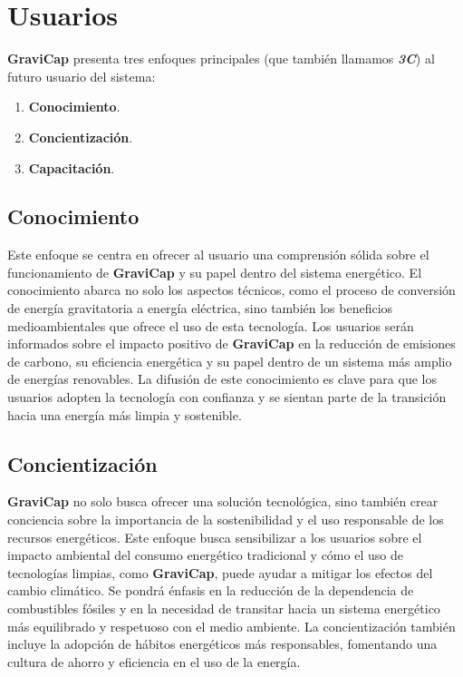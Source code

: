         \section{Usuarios}
            \textcolor{dark_violet}{\textbf{GraviCap}} presenta tres enfoques principales (que también llamamos \textcolor{light_violet}{\textbf{\textit{3C}}}) al futuro usuario del sistema:\par
            \begin{enumerate}
                \setlength{\itemindent}{2.5em}
                
                \item \textbf{Conocimiento}.
                \item \textbf{Concientización}.
                \item \textbf{Capacitación}.
            \end{enumerate}
            \subsection{Conocimiento}
                Este enfoque se centra en ofrecer al usuario una comprensión sólida sobre el funcionamiento de \textcolor{dark_violet}{\textbf{GraviCap}} y su papel dentro del sistema energético. El conocimiento abarca no solo los aspectos técnicos, como el proceso de conversión de energía gravitatoria a energía eléctrica, sino también los beneficios medioambientales que ofrece el uso de esta tecnología. Los usuarios serán informados sobre el impacto positivo de \textcolor{dark_violet}{\textbf{GraviCap}} en la reducción de emisiones de carbono, su eficiencia energética y su papel dentro de un sistema más amplio de energías renovables. La difusión de este conocimiento es clave para que los usuarios adopten la tecnología con confianza y se sientan parte de la transición hacia una energía más limpia y sostenible.
            \subsection{Concientización}
                \textcolor{dark_violet}{\textbf{GraviCap}} no solo busca ofrecer una solución tecnológica, sino también crear conciencia sobre la importancia de la sostenibilidad y el uso responsable de los recursos energéticos. Este enfoque busca sensibilizar a los usuarios sobre el impacto ambiental del consumo energético tradicional y cómo el uso de tecnologías limpias, como \textcolor{dark_violet}{\textbf{GraviCap}}, puede ayudar a mitigar los efectos del cambio climático. Se pondrá énfasis en la reducción de la dependencia de combustibles fósiles y en la necesidad de transitar hacia un sistema energético más equilibrado y respetuoso con el medio ambiente. La concientización también incluye la adopción de hábitos energéticos más responsables, fomentando una cultura de ahorro y eficiencia en el uso de la energía.\par
